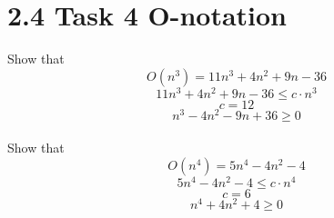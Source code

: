 \documentclass{article}
\begin{document}
\section{2.4 Task 4 O-notation}

Show that 
\[O(n^3)= 11n^3 +4n^2 + 9n - 36\]
\[11n^3 +4n^2 + 9n - 36 \leq  c \cdot n^3 \]
\[c = 12\]
\[n^3 - 4n^2 - 9n + 36 \geq 0\]
\\Show that 
\[O(n^4) = 5n^4 - 4n^{2} - 4\]
\[5n^4 - 4n^{2} - 4\leq  c \cdot n^4 \]
\[c = 6\]
\[n^4 + 4n^{2} + 4 \geq 0\]
\end{document}
